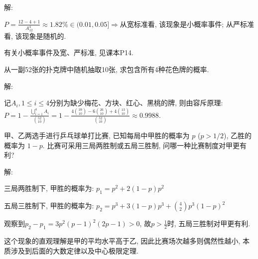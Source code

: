 \documentclass[standard]{ExBook}
\begin{document}
\begin{qitems}
\vspace{-5em}

    \begin{bbox}
解:

$P=\displaystyle{\frac{12-4+1}{A_{12}^{4}}}\approx1.82\%\in(0.01,0.05]$$\Longrightarrow$从宽标准看, 该现象是小概率事件; 从严标准看, 该现象是随机的.

\textcolor{themeColor}{\selectfont {} 有关小概率事件及宽、严标准, 见课本P14.}
    \end{bbox}

\vspace{-5em}

    \begin{bbox}
    \begin{shaded}
        \qitem
从一副52张的扑克牌中随机抽取10张, 求包含所有4种花色牌的概率.
    \end{shaded}
    \end{bbox}

\vspace{-5em}

    \begin{bbox}
解: 

记$A_{i},1\leq i\leq4$分别为缺少梅花、方块、红心、黑桃的牌, 则由容斥原理: $P=1-\frac{\bigcup\limits_{i=1}^{4}A_{i}}{\binom{52}{10}}=1-\frac{4\binom{39}{10}-6\binom{26}{10}+4\binom{13}{10}}{\binom{52}{10}}\approx0.9988$.
    \end{bbox}

\vspace{-5em}

    \begin{bbox}
    \begin{shaded}
        \qitem
甲、乙两选手进行乒乓球单打比赛, 已知每局中甲胜的概率为 $p$ ($p > 1/2$), 乙胜的概率为 $1 - p$. 比赛可采用三局两胜制或五局三胜制, 问哪一种比赛制度对甲更有利?
    \end{shaded}
    \end{bbox}

\vspace{-5em}

    \begin{bbox}
解:

三局两胜制下, 甲胜的概率为: $p_{1}=p^2+2(1-p)p^2$

五局三胜制下, 甲胜的概率为: $p_{2}=p^3+3(1-p)p^3+\binom{4}{2}p^3(1-p)^2$

观察到$p_{2}-p_{1}=3p^2(p-1)^2(2p-1)>0$, 故$p>\frac{1}{2}$时, 五局三胜制对甲更有利.

\textcolor{themeColor}{\selectfont {} 这个现象的直观理解是甲的平均水平高于乙, 因此比赛场次越多则偶然性越小, 本质涉及到后面的大数定律以及中心极限定理.}
    \end{bbox}


\end{qitems}
\end{document}
